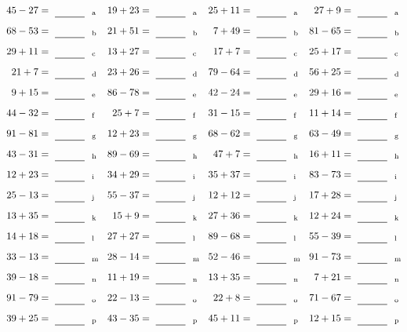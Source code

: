 \documentclass
[
  draft    = true,
  fontsize = 11pt,
  parskip  = half-
]
{scrartcl}
\begin{document}
\clearpage
\begin{align*}
    \pline{45-27}&=\rline{a}
  & \pline{19+23}&=\rline{a}
  & \pline{25+11}&=\rline{a}
  & \pline{27+9}&=\rline{a} \\[1ex]
    \pline{68-53}&=\rline{b}
  & \pline{21+51}&=\rline{b}
  & \pline{7+49}&=\rline{b}
  & \pline{81-65}&=\rline{b} \\[1ex]
    \pline{29+11}&=\rline{c}
  & \pline{13+27}&=\rline{c}
  & \pline{17+7}&=\rline{c}
  & \pline{25+17}&=\rline{c} \\[1ex]
    \pline{21+7}&=\rline{d}
  & \pline{23+26}&=\rline{d}
  & \pline{79-64}&=\rline{d}
  & \pline{56+25}&=\rline{d} \\[1ex]
    \pline{9+15}&=\rline{e}
  & \pline{86-78}&=\rline{e}
  & \pline{42-24}&=\rline{e}
  & \pline{29+16}&=\rline{e} \\[1ex]
    \pline{44-32}&=\rline{f}
  & \pline{25+7}&=\rline{f}
  & \pline{31-15}&=\rline{f}
  & \pline{11+14}&=\rline{f} \\[1ex]
    \pline{91-81}&=\rline{g}
  & \pline{12+23}&=\rline{g}
  & \pline{68-62}&=\rline{g}
  & \pline{63-49}&=\rline{g} \\[1ex]
    \pline{43-31}&=\rline{h}
  & \pline{89-69}&=\rline{h}
  & \pline{47+7}&=\rline{h}
  & \pline{16+11}&=\rline{h} \\[1ex]
    \pline{12+23}&=\rline{i}
  & \pline{34+29}&=\rline{i}
  & \pline{35+37}&=\rline{i}
  & \pline{83-73}&=\rline{i} \\[1ex]
    \pline{25-13}&=\rline{j}
  & \pline{55-37}&=\rline{j}
  & \pline{12+12}&=\rline{j}
  & \pline{17+28}&=\rline{j} \\[1ex]
    \pline{13+35}&=\rline{k}
  & \pline{15+9}&=\rline{k}
  & \pline{27+36}&=\rline{k}
  & \pline{12+24}&=\rline{k} \\[1ex]
    \pline{14+18}&=\rline{l}
  & \pline{27+27}&=\rline{l}
  & \pline{89-68}&=\rline{l}
  & \pline{55-39}&=\rline{l} \\[1ex]
    \pline{33-13}&=\rline{m}
  & \pline{28-14}&=\rline{m}
  & \pline{52-46}&=\rline{m}
  & \pline{91-73}&=\rline{m} \\[1ex]
    \pline{39-18}&=\rline{n}
  & \pline{11+19}&=\rline{n}
  & \pline{13+35}&=\rline{n}
  & \pline{7+21}&=\rline{n} \\[1ex]
    \pline{91-79}&=\rline{o}
  & \pline{22-13}&=\rline{o}
  & \pline{22+8}&=\rline{o}
  & \pline{71-67}&=\rline{o} \\[1ex]
    \pline{39+25}&=\rline{p}
  & \pline{43-35}&=\rline{p}
  & \pline{45+11}&=\rline{p}
  & \pline{12+15}&=\rline{p}
\end{align*}
\end{document}
